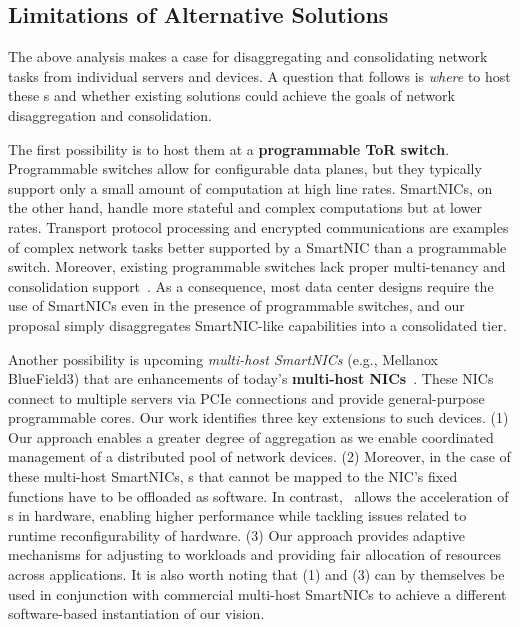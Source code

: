 \subsection{Limitations of Alternative Solutions}
\label{sec:snic:related}

The above analysis makes a case for disaggregating and consolidating network tasks from individual servers and devices.
A question that follows is \textit{where} to host these \nt{}s and whether existing solutions could achieve the goals of network disaggregation and consolidation.

%
The first possibility is to host them at a \textbf{programmable ToR switch}. Programmable switches allow for configurable data planes, but they typically support only a small amount of computation at high line rates. SmartNICs, on the other hand, handle more stateful and complex computations but at lower rates. Transport protocol processing and encrypted communications are examples of complex network tasks better supported by a SmartNIC than a programmable switch. Moreover, existing programmable switches lack proper multi-tenancy and consolidation support~\cite{Wang-HotCloud20}. As a consequence, most data center designs require the use of SmartNICs even in the presence of programmable switches, and our proposal simply disaggregates SmartNIC-like capabilities into a consolidated tier.


Another possibility is upcoming \emph{multi-host SmartNICs} (e.g., Mellanox BlueField3) that are enhancements of today's \textbf{multi-host NICs}~\cite{ocp-nic,Intel-RedRockCanyon}. These NICs connect to multiple servers via PCIe connections and provide general-purpose programmable cores. Our work identifies three key extensions to such devices. (1) Our approach enables a greater degree of aggregation as we enable coordinated management of a distributed pool of network devices. (2) Moreover, in the case of these multi-host SmartNICs, \nt{}s that cannot be mapped to the NIC's fixed functions have to be offloaded as software. In contrast, \snic\ allows the acceleration of \nt{}s in hardware, enabling higher performance while tackling issues related to runtime reconfigurability of hardware. (3) Our approach provides adaptive mechanisms for adjusting to workloads and providing fair allocation of resources across applications. It is also worth noting that (1) and (3) can by themselves be used in conjunction with commercial multi-host SmartNICs to achieve a different software-based instantiation of our vision.

